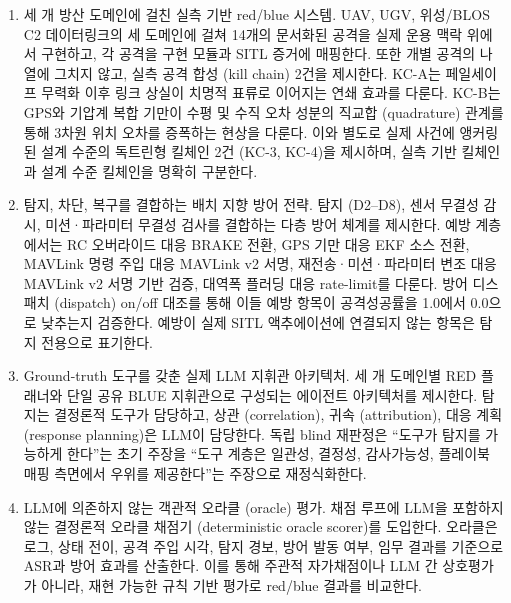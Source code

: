 \begin{enumerate}[leftmargin=*, label=\textbf{\arabic*.}]
    \item 세 개 방산 도메인에 걸친 실측 기반 red/blue 시스템.
    UAV, UGV, 위성/BLOS C2 데이터링크의 세 도메인에 걸쳐 14개의 문서화된 공격을 실제 운용 맥락 위에서 구현하고, 각 공격을 구현 모듈과 SITL 증거에 매핑한다. 또한 개별 공격의 나열에 그치지 않고, 실측 공격 합성 (kill chain) 2건을 제시한다. KC-A는 페일세이프 무력화 이후 링크 상실이 치명적 표류로 이어지는 연쇄 효과를 다룬다. KC-B는 GPS와 기압계 복합 기만이 수평 및 수직 오차 성분의 직교합 (quadrature) 관계를 통해 3차원 위치 오차를 증폭하는 현상을 다룬다. 이와 별도로 실제 사건에 앵커링된 설계 수준의 독트린형 킬체인 2건 (KC-3, KC-4)을 제시하며, 실측 기반 킬체인과 설계 수준 킬체인을 명확히 구분한다.
    \item 탐지, 차단, 복구를 결합하는 배치 지향 방어 전략.
    탐지 (D2--D8), 센서 무결성 감시, 미션·파라미터 무결성 검사를 결합하는 다층 방어 체계를 제시한다. 예방 계층에서는 RC 오버라이드 대응 BRAKE 전환, GPS 기만 대응 EKF 소스 전환, MAVLink 명령 주입 대응 MAVLink v2 서명, 재전송·미션·파라미터 변조 대응 MAVLink v2 서명 기반 검증, 대역폭 플러딩 대응 rate-limit를 다룬다. 방어 디스패치 (dispatch) on/off 대조를 통해 이들 예방 항목이 공격성공률을 1.0에서 0.0으로 낮추는지 검증한다. 예방이 실제 SITL 액추에이션에 연결되지 않는 항목은 탐지 전용으로 표기한다.
    \item Ground-truth 도구를 갖춘 실제 LLM 지휘관 아키텍처.
    세 개 도메인별 RED 플래너와 단일 공유 BLUE 지휘관으로 구성되는 에이전트 아키텍처를 제시한다. 탐지는 결정론적 도구가 담당하고, 상관 (correlation), 귀속 (attribution), 대응 계획 (response planning)은 LLM이 담당한다. 독립 blind 재판정은 ``도구가 탐지를 가능하게 한다''는 초기 주장을 ``도구 계층은 일관성, 결정성, 감사가능성, 플레이북 매핑 측면에서 우위를 제공한다''는 주장으로 재정식화한다.
    \item LLM에 의존하지 않는 객관적 오라클 (oracle) 평가.
    채점 루프에 LLM을 포함하지 않는 결정론적 오라클 채점기 (deterministic oracle scorer)를 도입한다. 오라클은 로그, 상태 전이, 공격 주입 시각, 탐지 경보, 방어 발동 여부, 임무 결과를 기준으로 ASR과 방어 효과를 산출한다. 이를 통해 주관적 자가채점이나 LLM 간 상호평가가 아니라, 재현 가능한 규칙 기반 평가로 red/blue 결과를 비교한다.
\end{enumerate}
